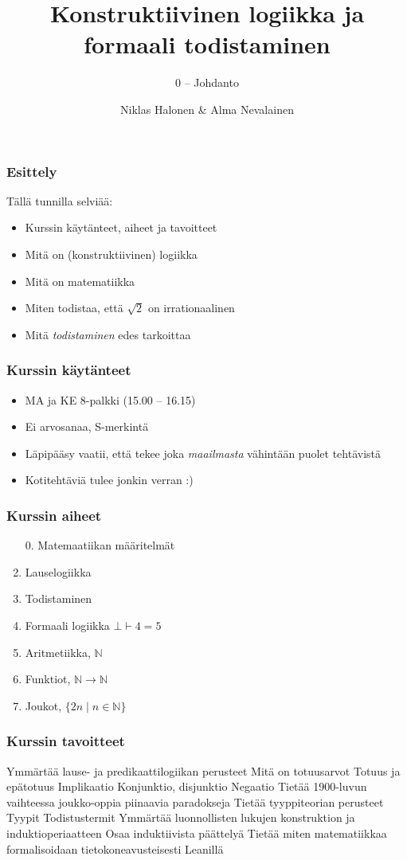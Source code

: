 \documentclass{beamer}
\title{Konstruktiivinen logiikka ja formaali todistaminen}
\subtitle{0 – Johdanto}
\author{Niklas Halonen \& Alma Nevalainen}
\renewcommand{\r}{\rightarrow}
\newcommand{\N}{\mathbb{N}}
\begin{document}
\addtocounter{framenumber}{-1}

\frame{\titlepage}

\begin{frame}
  \frametitle{Esittely}
  Tällä tunnilla selviää:
  \begin{itemize}
    \item Kurssin käytänteet, aiheet ja tavoitteet
    \item Mitä on (konstruktiivinen) logiikka
    \item Mitä on matematiikka
    \item Miten todistaa, että $\sqrt 2$ on irrationaalinen
    \item Mitä \emph{todistaminen} edes tarkoittaa
  \end{itemize}
\end{frame}

\begin{frame}
  \frametitle{Kurssin käytänteet}
  \begin{itemize}
    \item MA ja KE 8-palkki (15.00 – 16.15)
    \item Ei arvosanaa, S-merkintä
    \item Läpipääsy vaatii, että tekee joka \emph{maailmasta} vähintään puolet tehtävistä
    \item Kotitehtäviä tulee jonkin verran :)
  \end{itemize}
\end{frame}

\begin{frame}
  \frametitle{Kurssin aiheet}
  \begin{enumerate}
    \item[0.] Matemaatiikan määritelmät
    \item Lauselogiikka
    \item Todistaminen
    \item Formaali logiikka $\bot \vdash 4 = 5$
    \item Aritmetiikka, $\N$
    \item Funktiot, $\N \r \N$
    \item Joukot, $\{2n \mid n \in \N\}$
  \end{enumerate}
\end{frame}

\begin{frame}
  \frametitle{Kurssin tavoitteet}
  \begin{outline}
    \1 Ymmärtää lause- ja predikaattilogiikan perusteet
      \2 Mitä on totuusarvot
      \2 Totuus ja epätotuus
      \2 Implikaatio
      \2 Konjunktio, disjunktio
      \2 Negaatio
    \1 Tietää 1900-luvun vaihteessa joukko-oppia piinaavia paradokseja
    \1 Tietää tyyppiteorian perusteet
      \2 Tyypit
      \2 Todistustermit
    \1 Ymmärtää luonnollisten lukujen konstruktion ja induktioperiaatteen
    \1 Osaa induktiivista päättelyä
    \1 Tietää miten matematiikkaa formalisoidaan tietokoneavusteisesti Leanillä
  \end{outline}
\end{frame}
\end{document}

